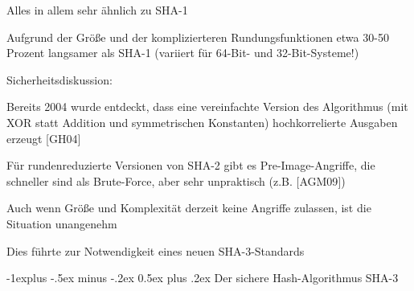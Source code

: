 \documentclass[a4paper]{article}
\makeatletter
\renewcommand{\subsection}{\@startsection{subsection}{2}{0mm}%
 {-1explus -.5ex minus -.2ex}%
 {0.5ex plus .2ex}%
 {\normalfont\normalsize\bfseries}}
\makeatother
\begin{document}
\begin{multicols}{3}
\begin{itemize*}
            \begin{itemize*}
                  \item Alles in allem sehr ähnlich zu SHA-1
                  \item Aufgrund der Größe und der komplizierteren Rundungsfunktionen etwa 30-50 Prozent langsamer als SHA-1 (variiert für 64-Bit- und 32-Bit-Systeme!)
                  \item Sicherheitsdiskussion:
                  \begin{itemize*} \item Bereits 2004 wurde entdeckt, dass eine vereinfachte Version des Algorithmus (mit XOR statt Addition und symmetrischen Konstanten) hochkorrelierte Ausgaben erzeugt {[}GH04{]} \item Für rundenreduzierte Versionen von SHA-2 gibt es Pre-Image-Angriffe, die schneller sind als Brute-Force, aber sehr unpraktisch (z.B. {[}AGM09{]}) \item Auch wenn Größe und Komplexität derzeit keine Angriffe zulassen, ist die Situation unangenehm \item Dies führte zur Notwendigkeit eines neuen SHA-3-Standards \end{itemize*}
            \end{itemize*}
      \end{itemize*}


      \subsection{Der sichere Hash-Algorithmus
            SHA-3}


\end{multicols}
\end{document}
